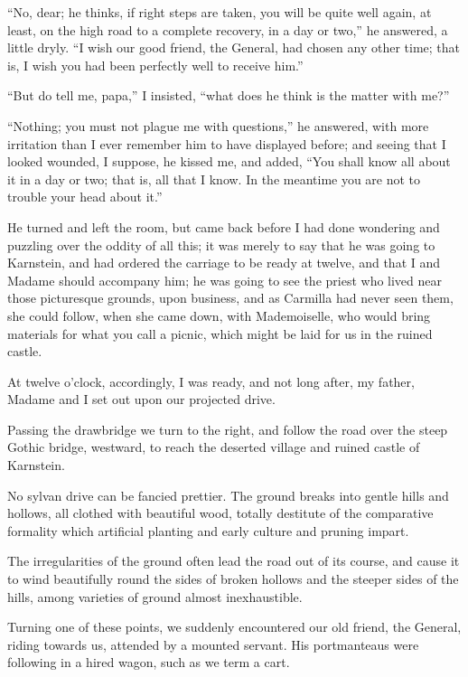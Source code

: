 \documentclass[11pt,twoside,makeidx,hidelinks,]{memoir}
\begin{document}
``No, dear; he thinks, if right steps are taken, you will be quite well
again, at least, on the high road to a complete recovery, in a day or
two,'' he answered, a little dryly. ``I wish our good friend, the General,
had chosen any other time; that is, I wish you had been perfectly well
to receive him.''

``But do tell me, papa,'' I insisted, ``what does he think is the matter
with me?''

``Nothing; you must not plague me with questions,'' he answered, with more
irritation than I ever remember him to have displayed before; and seeing
that I looked wounded, I suppose, he kissed me, and added, ``You shall
know all about it in a day or two; that is, all that I know. In the
meantime you are not to trouble your head about it.''

He turned and left the room, but came back before I had done wondering
and puzzling over the oddity of all this; it was merely to say that he
was going to Karnstein, and had ordered the carriage to be ready at
twelve, and that I and Madame should accompany him; he was going to see the
priest who lived near those picturesque grounds, upon business, and as
Carmilla had never seen them, she could follow, when she came down, with
Mademoiselle, who would bring materials for what you call a picnic,
which might be laid for us in the ruined castle.

At twelve o'clock, accordingly, I was ready, and not long after, my
father, Madame and I set out upon our projected drive.

Passing the drawbridge we turn to the right, and follow the road over
the steep Gothic bridge, westward, to reach the deserted village and
ruined castle of Karnstein.

No sylvan drive can be fancied prettier. The ground breaks into gentle
hills and hollows, all clothed with beautiful wood, totally destitute of
the comparative formality which artificial planting and early culture
and pruning impart.

The irregularities of the ground often lead the road out of its course,
and cause it to wind beautifully round the sides of broken hollows and
the steeper sides of the hills, among varieties of ground almost
inexhaustible.

Turning one of these points, we suddenly encountered our old friend, the
General, riding towards us, attended by a mounted servant. His
portmanteaus were following in a hired wagon, such as we term a cart.
\end{document}

